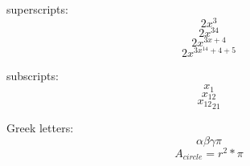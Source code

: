 \documentclass[11]{article}
\begin{document}
superscripts: 
$$ 2x^3 $$ %
$$ 2x^{34} $$ %
$$ 2x^{ 3x + 4} $$
$$ 2x^{ 3x^{14} + 4 + 5} $$ %

subscripts: 
$$ x_1 $$
$$ x_{12} $$
$$ {x_{12}}_{21} $$ %

Greek letters: 
$$ \alpha \beta \gamma \pi $$ %
$$ A_{circle} = r^2 * \pi $$
\end{document}
